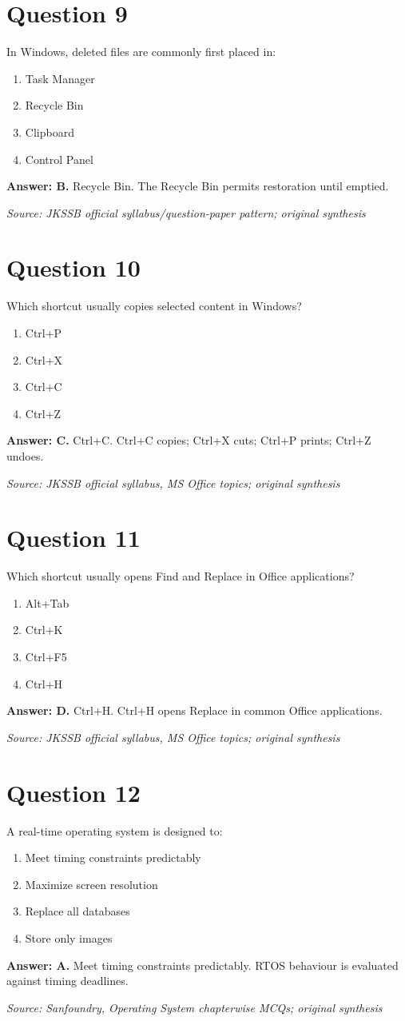 \documentclass[11pt,a4paper]{book}
\newcommand{\source}[1]{\par\smallskip\textit{Source: #1}}
\newcommand{\answer}[2]{\par\textbf{Answer: #1.} #2}
\begin{document}
\section*{Question 9}
In Windows, deleted files are commonly first placed in:
\begin{enumerate}[label=\Alph*.]
\item Task Manager
\item Recycle Bin
\item Clipboard
\item Control Panel
\end{enumerate}
\answer{B}{Recycle Bin. The Recycle Bin permits restoration until emptied.}
\source{JKSSB official syllabus/question-paper pattern; original synthesis}
\section*{Question 10}
Which shortcut usually copies selected content in Windows?
\begin{enumerate}[label=\Alph*.]
\item Ctrl+P
\item Ctrl+X
\item Ctrl+C
\item Ctrl+Z
\end{enumerate}
\answer{C}{Ctrl+C. Ctrl+C copies; Ctrl+X cuts; Ctrl+P prints; Ctrl+Z undoes.}
\source{JKSSB official syllabus, MS Office topics; original synthesis}
\section*{Question 11}
Which shortcut usually opens Find and Replace in Office applications?
\begin{enumerate}[label=\Alph*.]
\item Alt+Tab
\item Ctrl+K
\item Ctrl+F5
\item Ctrl+H
\end{enumerate}
\answer{D}{Ctrl+H. Ctrl+H opens Replace in common Office applications.}
\source{JKSSB official syllabus, MS Office topics; original synthesis}
\section*{Question 12}
A real-time operating system is designed to:
\begin{enumerate}[label=\Alph*.]
\item Meet timing constraints predictably
\item Maximize screen resolution
\item Replace all databases
\item Store only images
\end{enumerate}
\answer{A}{Meet timing constraints predictably. RTOS behaviour is evaluated against timing deadlines.}
\source{Sanfoundry, Operating System chapterwise MCQs; original synthesis}
\end{document}
